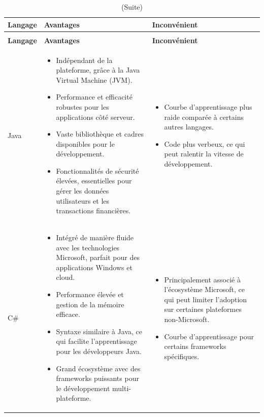 \documentclass[12pt]{report}
\begin{document}
				\begin{longtable}{|p{3cm}|p{5.5cm}|p{5.5cm}|} 
						\caption{Comparaison entre Java et C\#.} 
						\label{tab:backend}\\ 
						\hline 
						\textbf{Langage} & \textbf{Avantages} & \textbf{Inconvénient}\\ 
						\hline 
						\endfirsthead 	
						\caption[]{(Suite)}\\ 
						\hline 
						\textbf{Langage} & \textbf{Avantages} & \textbf{Inconvénient}\\ 
						\hline 
						\endhead
						Java&
						\begin{itemize}
							\item Indépendant de la plateforme, grâce à la Java Virtual Machine (JVM).
							\item Performance et efficacité robustes pour les applications côté serveur.
							\item Vaste bibliothèque et cadres disponibles pour le développement.
							\item Fonctionnalités de sécurité élevées, essentielles pour gérer les données utilisateurs et les transactions financières.
						\end{itemize}
						&
						\begin{itemize}
							\item Courbe d'apprentissage plus raide comparée à certains autres langages.
							\item Code plus verbeux, ce qui peut ralentir la vitesse de développement.
						\end{itemize}\\						
						\hline
						C\# &
						\begin{itemize}
							\item Intégré de manière fluide avec les technologies Microsoft, parfait pour des applications Windows et cloud.
							\item Performance élevée et gestion de la mémoire efficace.
							\item Syntaxe similaire à Java, ce qui facilite l'apprentissage pour les développeurs Java.
							\item Grand écosystème avec des frameworks puissants pour le développement multi-plateforme.
						\end{itemize} &
						\begin{itemize}
							\item Principalement associé à l'écosystème Microsoft, ce qui peut limiter l'adoption sur certaines plateformes non-Microsoft.
							\item Courbe d'apprentissage pour certains frameworks spécifiques.
						\end{itemize} \\
						\hline
				    \end{longtable}
\end{document}
